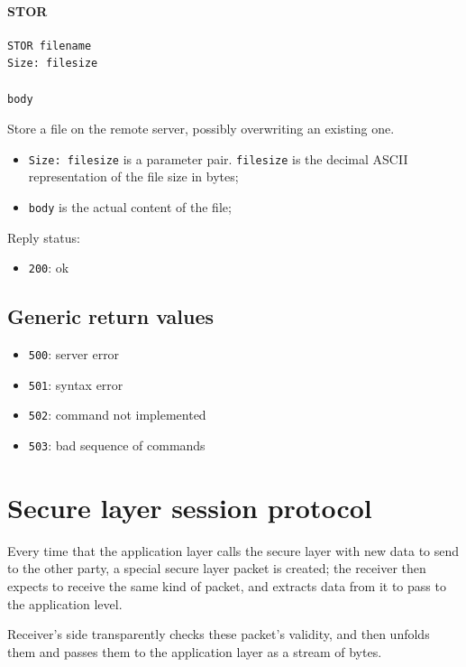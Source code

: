\documentclass[a4paper,12pt]{article}
\begin{document}
\paragraph{STOR}
\begin{verbatim}
STOR filename
Size: filesize

body
\end{verbatim}

Store a file on the remote server, possibly overwriting an existing one.

\begin{itemize}
  \item \texttt{Size: filesize} is a parameter pair. \texttt{filesize} is the decimal ASCII representation of the file size in bytes;
  \item \texttt{body} is the actual content of the file;
\end{itemize}

Reply status:
\begin{itemize}
  \item \texttt{200}: ok
\end{itemize}

\subsection{Generic return values}
\begin{itemize}
  \item \texttt{500}: server error
  \item \texttt{501}: syntax error
  \item \texttt{502}: command not implemented
  \item \texttt{503}: bad sequence of commands
\end{itemize}

\section{Secure layer session protocol}
Every time that the application layer calls the secure layer with new data to send to the other party, a special secure layer packet is created; the receiver then expects to receive the same kind of packet, and extracts data from it to pass to the application level.

Receiver's side transparently checks these packet's validity, and then unfolds them and passes them to the application layer as a stream of bytes.
\end{document}
